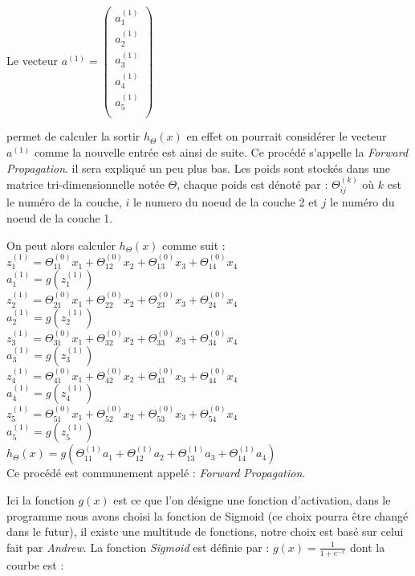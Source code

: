 Le vecteur $a^{(1)} = \begin{pmatrix}
  a_1^{(1)}  \\
  a_2^{(1)}  \\
  a_3^{(1)}  \\
  a_4^{(1)}  \\
  a_5^{(1)}  \\
 \end{pmatrix}$

permet de calculer la sortir $h_\Theta(x)$ en effet on pourrait considérer le vecteur $a^{(1)}$ comme la nouvelle entrée est ainsi de suite. Ce procédé s'appelle la \textit{Forward Propagation}. il sera expliqué un peu plus bas.
Les poids sont stockés dans une matrice tri-dimensionnelle notée $\Theta$, chaque poids est dénoté par : $\Theta_{ij}^{(k)}$ où $k$ est le numéro de la couche, $i$ le numero du noeud de la couche 2 et $j$ le numéro du noeud de la couche 1.

On peut alors calculer $h_\Theta(x)$ comme suit :\\
$z_1^{(1)} = \Theta_{11}^{(0)}x_1 + \Theta_{12}^{(0)}x_2 + \Theta_{13}^{(0)}x_3 + \Theta_{14}^{(0)}x_4$\\
$a_1^{(1)} = g(z_1^{(1)})$\\
$z_2^{(1)} = \Theta_{21}^{(0)}x_1 + \Theta_{22}^{(0)}x_2 + \Theta_{23}^{(0)}x_3 + \Theta_{24}^{(0)}x_4$\\
$a_2^{(1)} = g(z_2^{(1)})$\\
$z_3^{(1)} = \Theta_{31}^{(0)}x_1 + \Theta_{32}^{(0)}x_2 + \Theta_{33}^{(0)}x_3 + \Theta_{34}^{(0)}x_4$\\
$a_3^{(1)} = g(z_3^{(1)})$\\
$z_4^{(1)} = \Theta_{41}^{(0)}x_1 + \Theta_{42}^{(0)}x_2 + \Theta_{43}^{(0)}x_3 + \Theta_{44}^{(0)}x_4$\\
$a_4^{(1)} = g(z_4^{(1)})$\\
$z_5^{(1)} = \Theta_{51}^{(0)}x_1 + \Theta_{52}^{(0)}x_2 + \Theta_{53}^{(0)}x_3 + \Theta_{54}^{(0)}x_4$\\
$a_5^{(1)} = g(z_5^{(1)})$\\
$h_\Theta(x) = g(\Theta_{11}^{(1)}a_1 + \Theta_{12}^{(1)}a_2 + \Theta_{13}^{(1)}a_3 + \Theta_{14}^{(1)}a_4)$\\

Ce procédé est communement appelé : \textit{Forward Propagation}.

Ici la fonction $g(x)$ est ce que l'on désigne une fonction d'activation, dans le programme nous avons choisi la fonction de Sigmoid (ce choix pourra être changé dans le futur), il existe une multitude de fonctions, notre choix est basé sur celui fait par \textit{Andrew}.
La fonction \textit{Sigmoid} est définie par : $g(x) = \frac{1}{1 + e^{-x}}$ dont la courbe est :

